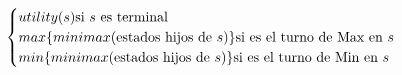 \documentclass[preview]{standalone}
\begin{document}
\begin{align*}
\begin{cases}
                                 utility(s) \text{si $s$ es terminal} \cr
                                 max\{minimax(\text{estados hijos de $s$})\} \text{si es el turno de Max en $s$} \cr
                                 min\{minimax(\text{estados hijos de $s$})\} \text{si es el turno de Min en $s$} \cr
                                 \end{cases}
\end{align*}
\end{document}
